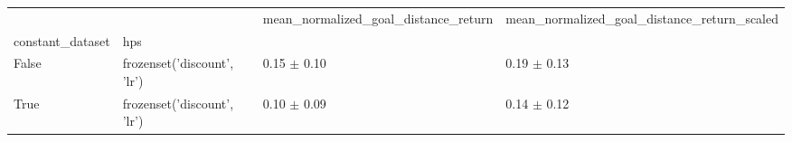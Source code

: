 \begin{tabular}{llll}
\toprule
 &  & mean_normalized_goal_distance_return & mean_normalized_goal_distance_return_scaled \\
constant_dataset & hps &  &  \\
\midrule
False & frozenset({'discount', 'lr'}) & 0.15 $\pm$ 0.10 & 0.19 $\pm$ 0.13 \\
\cline{1-4}
True & frozenset({'discount', 'lr'}) & 0.10 $\pm$ 0.09 & 0.14 $\pm$ 0.12 \\
\cline{1-4}
\bottomrule
\end{tabular}

